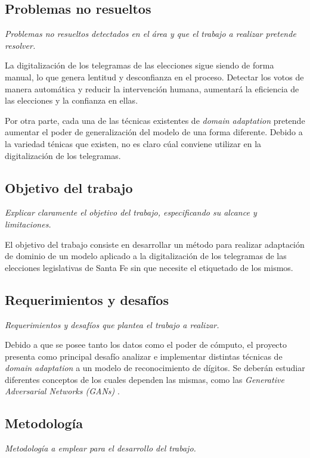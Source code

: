 \documentclass[a4paper, twoside]{report}
\begin{document}
\subsection*{Problemas no resueltos}
{\it Problemas no resueltos detectados en el área y que el trabajo a realizar
	pretende resolver.}

La digitalizaci\'on de los telegramas de las elecciones sigue siendo de forma manual, lo que genera lentitud y desconfianza en el proceso. Detectar los votos
de manera autom\'atica y reducir la intervenci\'on humana, aumentar\'a la eficiencia de las elecciones y la confianza en ellas.

Por otra parte, cada una de las t\'ecnicas existentes de {\it domain adaptation} pretende aumentar el poder de generalizaci\'on del modelo de una forma
diferente. Debido a la variedad t\'enicas que existen, no es claro c\'ual conviene utilizar en la digitalizaci\'on de los telegramas.

\subsection*{Objetivo del trabajo}
{\it Explicar claramente el objetivo del trabajo, especificando su alcance y limitaciones.}

El objetivo del trabajo consiste en desarrollar un m\'etodo para realizar adaptaci\'on de dominio de un modelo aplicado a la digitalizaci\'on de los telegramas
de las elecciones legislativas de Santa Fe sin que necesite el etiquetado de los mismos.

\subsection*{Requerimientos y desafíos}
{\it Requerimientos y desafíos que plantea el trabajo a realizar.}

Debido a que se posee tanto los datos como el poder de c\'omputo, el proyecto presenta como principal desaf\'io analizar e implementar distintas t\'ecnicas de
	{\it domain adaptation} a un modelo de reconocimiento de d\'igitos. Se deber\'an estudiar diferentes conceptos de los cuales dependen las mismas, como las {\it
		Generative Adversarial Networks (GANs)} \cite{Tzeng_2017,ganin2016domain}.

\subsection*{Metodología}
{\it Metodología a emplear para el desarrollo del trabajo.}
\end{document}
